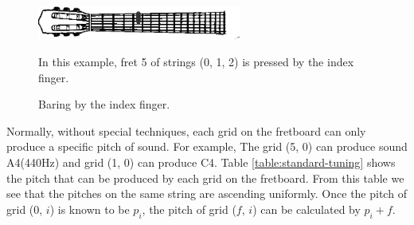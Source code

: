 \begin{figure}[h]
    \centering
    \includegraphics[width=0.6\textwidth]{Figures/fretboard-baring.eps}
    \caption{Baring by the index finger.}
    \label{fig:fretboard-baring}
    \startdescription
    In this example, fret 5 of strings (0, 1, 2) is pressed by the index finger.
\end{figure}

Normally, without special techniques, each grid on the fretboard can only produce a specific
pitch of sound. For example, The grid (5, 0) can produce sound A4(440Hz) and grid (1, 0) can produce C4. Table \ref{table:standard-tuning} shows the pitch that can be produced by each grid on the fretboard. From this table we see that the pitches on the same string are ascending uniformly. Once the pitch of grid (0, $i$) is known to be $p_i$, the pitch of grid ($f$, $i$) can be calculated by $p_i + f$.

